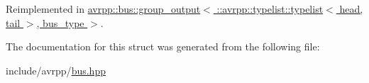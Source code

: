 Reimplemented in \hyperlink{structavrpp_1_1bus_1_1group__output_3_01_1_1avrpp_1_1typelist_1_1typelist_3_01head_00_01tail_01_4_00_01bus__type_01_4_a8f38159613b1738f164276c3f028f87c}{avrpp::bus::group\_\-output$<$ ::avrpp::typelist::typelist$<$ head, tail $>$, bus\_\-type $>$}.



The documentation for this struct was generated from the following file:\begin{DoxyCompactItemize}
\item 
include/avrpp/\hyperlink{bus_8hpp}{bus.hpp}\end{DoxyCompactItemize}
